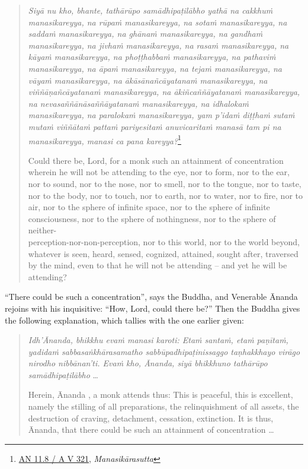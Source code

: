\begin{quote}
\emph{Siyā nu kho, bhante, tathārūpo samādhipaṭilābho yathā na cakkhuṁ manasikareyya, na rūpaṁ manasikareyya, na sotaṁ manasikareyya, na saddaṁ manasikareyya, na ghānaṁ manasikareyya, na gandhaṁ manasikareyya, na jivhaṁ manasikareyya, na rasaṁ manasikareyya, na kāyaṁ manasikareyya, na phoṭṭhabbaṁ manasikareyya, na pathaviṁ manasikareyya, na āpaṁ manasikareyya, na tejaṁ manasikareyya, na vāyaṁ manasikareyya, na ākāsānañcāyatanaṁ manasikareyya, na viññāṇañcāyatanaṁ manasikareyya, na ākiñcaññāyatanaṁ manasikareyya, na nevasaññānāsaññāyatanaṁ manasikareyya, na idhalokaṁ manasikareyya, na paralokaṁ manasikareyya, yam p'idaṁ diṭṭhaṁ sutaṁ mutaṁ viññātaṁ pattaṁ pariyesitaṁ anuvicaritaṁ manasā tam pi na manasikareyya, manasi ca pana kareyya?}\footnote{\href{https://suttacentral.net/an11.8/pli/ms}{AN 11.8 / A V 321}, \emph{Manasikārasutta}}

Could there be, Lord, for a monk such an attainment of concentration wherein he will not be attending to the eye, nor to form, nor to the ear, nor to sound, nor to the nose, nor to smell, nor to the tongue, nor to taste, nor to the body, nor to touch, nor to earth, nor to water, nor to fire, nor to air, nor to the sphere of infinite space, nor to the sphere of infinite consciousness, nor to the sphere of nothingness, nor to the sphere of neither-\\ perception-nor-non-perception, nor to this world, nor to the world beyond, whatever is seen, heard, sensed, cognized, attained, sought after, traversed by the mind, even to that he will not be attending -- and yet he will be attending?
\end{quote}

``There could be such a concentration'', says the Buddha, and Venerable Ānanda rejoins with his inquisitive: ``How, Lord, could there be?'' Then the Buddha gives the following explanation, which tallies with the one earlier given:

\begin{quote}
\emph{Idh'Ānanda, bhikkhu evaṁ manasi karoti: Etaṁ santaṁ, etaṁ paṇītaṁ, yadidaṁ sabbasaṅkhārasamatho sabbūpadhipaṭinissaggo taṇhakkhayo virāgo nirodho nibbānan'ti. Evaṁ kho, Ānanda, siyā bhikkhuno tathārūpo samādhipaṭilābho} \ldots{}

Herein, Ānanda , a monk attends thus: This is peaceful, this is excellent, namely the stilling of all preparations, the relinquishment of all assets, the destruction of craving, detachment, cessation, extinction. It is thus, Ānanda, that there could be such an attainment of concentration \ldots{}
\end{quote}

